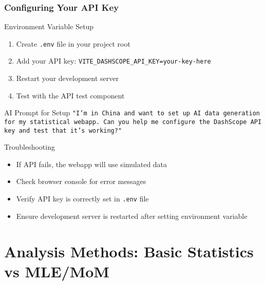 \documentclass[aspectratio=169]{beamer}
\begin{document}
\begin{frame}
\frametitle{Configuring Your API Key}
\begin{alertblock}{Environment Variable Setup}
\begin{enumerate}
\item Create \texttt{.env} file in your project root
\item Add your API key: \texttt{VITE\_DASHSCOPE\_API\_KEY=your-key-here}
\item Restart your development server
\item Test with the API test component
\end{enumerate}
\end{alertblock}

\begin{exampleblock}{AI Prompt for Setup}
\texttt{"I'm in China and want to set up AI data generation for my statistical webapp. Can you help me configure the DashScope API key and test that it's working?"}
\end{exampleblock}

\begin{alertblock}{Troubleshooting}
\begin{itemize}
\item If API fails, the webapp will use simulated data
\item Check browser console for error messages
\item Verify API key is correctly set in \texttt{.env} file
\item Ensure development server is restarted after setting environment variable
\end{itemize}
\end{alertblock}
\end{frame}

\section{Analysis Methods: Basic Statistics vs MLE/MoM}
\end{document}

